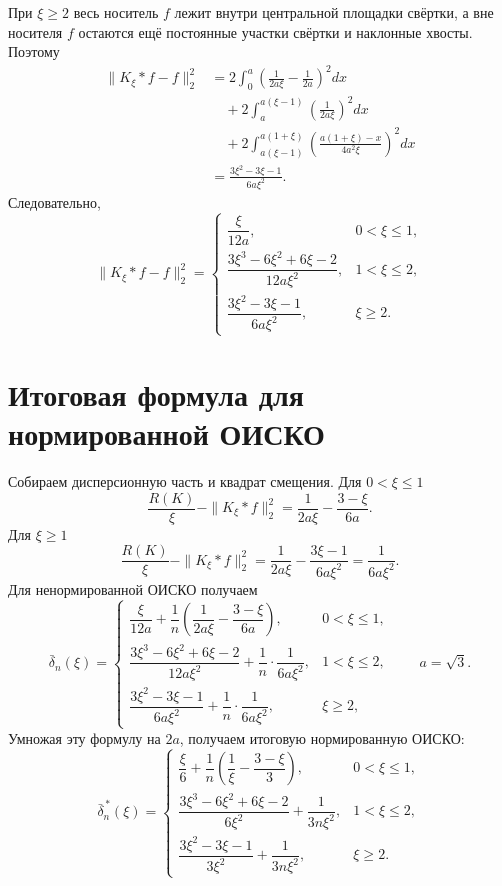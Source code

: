 \documentclass[12pt,a4paper]{article}
\begin{document}
При $\xi\ge 2$ весь носитель $f$ лежит внутри центральной площадки
свёртки, а вне носителя $f$ остаются ещё постоянные участки свёртки и
наклонные хвосты. Поэтому
\[
\begin{aligned}
\|K_\xi*f-f\|_2^2
&=2\int_0^a
\left(\frac{1}{2a\xi}-\frac{1}{2a}\right)^2dx\\
&\quad
+2\int_a^{a(\xi-1)}
\left(\frac{1}{2a\xi}\right)^2dx\\
&\quad
+2\int_{a(\xi-1)}^{a(1+\xi)}
\left(\frac{a(1+\xi)-x}{4a^2\xi}\right)^2dx\\
&=\frac{3\xi^2-3\xi-1}{6a\xi^2}.
\end{aligned}
\]
Следовательно,
\[
\|K_\xi*f-f\|_2^2=
\begin{cases}
\dfrac{\xi}{12a}, & 0<\xi\le 1,\\[6pt]
\dfrac{3\xi^3-6\xi^2+6\xi-2}{12a\xi^2}, & 1<\xi\le 2,\\[6pt]
\dfrac{3\xi^2-3\xi-1}{6a\xi^2}, & \xi\ge 2.
\end{cases}
\]

\section*{Итоговая формула для нормированной ОИСКО}

Собираем дисперсионную часть и квадрат смещения. Для $0<\xi\le 1$
\[
\frac{R(K)}{\xi}-\|K_\xi*f\|_2^2
=\frac{1}{2a\xi}-\frac{3-\xi}{6a}.
\]
Для $\xi\ge 1$
\[
\frac{R(K)}{\xi}-\|K_\xi*f\|_2^2
=\frac{1}{2a\xi}-\frac{3\xi-1}{6a\xi^2}
=\frac{1}{6a\xi^2}.
\]
Для ненормированной ОИСКО получаем
\[
\bar{\delta}_n(\xi)=
\begin{cases}
\dfrac{\xi}{12a}
+
\dfrac{1}{n}\left(\dfrac{1}{2a\xi}-\dfrac{3-\xi}{6a}\right),
& 0<\xi\le 1,\\[10pt]
\dfrac{3\xi^3-6\xi^2+6\xi-2}{12a\xi^2}
+
\dfrac{1}{n}\cdot\dfrac{1}{6a\xi^2},
& 1<\xi\le 2,\\[10pt]
\dfrac{3\xi^2-3\xi-1}{6a\xi^2}
+
\dfrac{1}{n}\cdot\dfrac{1}{6a\xi^2},
& \xi\ge 2,
\end{cases}
\qquad a=\sqrt{3}.
\]
Умножая эту формулу на $2a$, получаем итоговую нормированную ОИСКО:
\[
\bar{\delta}^{\,*}_n(\xi)=
\begin{cases}
\dfrac{\xi}{6}
+
\dfrac{1}{n}\left(\dfrac{1}{\xi}-\dfrac{3-\xi}{3}\right),
& 0<\xi\le 1,\\[10pt]
\dfrac{3\xi^3-6\xi^2+6\xi-2}{6\xi^2}
+
\dfrac{1}{3n\xi^2},
& 1<\xi\le 2,\\[10pt]
\dfrac{3\xi^2-3\xi-1}{3\xi^2}
+
\dfrac{1}{3n\xi^2},
& \xi\ge 2.
\end{cases}
\]
\end{document}

